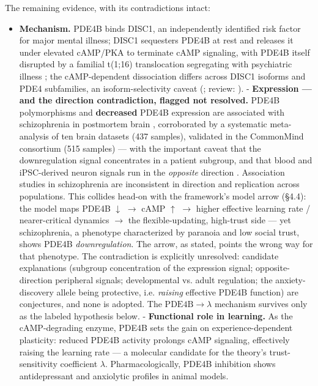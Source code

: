 \documentclass[11pt,twocolumn]{article}
\theoremstyle{plain}
\begin{document}
The remaining evidence, with its contradictions intact:

\begin{itemize}

\item \textbf{Mechanism.} PDE4B binds DISC1, an independently identified risk factor for major mental illness; DISC1 sequesters PDE4B at rest and releases it under elevated cAMP/PKA to terminate cAMP signaling, with PDE4B itself disrupted by a familial t(1;16) translocation segregating with psychiatric illness \citep{millar2005}; the cAMP-dependent dissociation differs across DISC1 isoforms and PDE4 subfamilies, an isoform-selectivity caveat (\citealp{murdoch2007}; review: \citealp{millar2007}).
- \textbf{Expression — and the direction contradiction, flagged not resolved.} PDE4B polymorphisms and \textbf{decreased} PDE4B expression are associated with schizophrenia in postmortem brain \citep{fatemi2008}, corroborated by a systematic meta-analysis of ten brain datasets (437 samples), validated in the CommonMind consortium (515 samples) — with the important caveat that the downregulation signal concentrates in a patient subgroup, and that blood and iPSC-derived neuron signals run in the \textit{opposite} direction \citep{burrack2024}. Association studies in schizophrenia are inconsistent in direction and replication across populations. This collides head-on with the framework's model arrow (\S{}4.4): the model maps PDE4B $\downarrow$ $\to$ cAMP $\uparrow$ $\to$ higher effective learning rate / nearer-critical dynamics $\to$ the flexible-updating, high-trust side — yet schizophrenia, a phenotype characterized by paranoia and low social trust, shows PDE4B \textit{downregulation}. The arrow, as stated, points the wrong way for that phenotype. The contradiction is explicitly unresolved: candidate explanations (subgroup concentration of the expression signal; opposite-direction peripheral signals; developmental vs. adult regulation; the anxiety-discovery allele being protective, i.e. \textit{raising} effective PDE4B function) are conjectures, and none is adopted. The $\mathrm{PDE4B} \to \lambda$ mechanism survives only as the labeled hypothesis below.
- \textbf{Functional role in learning.} As the cAMP-degrading enzyme, PDE4B sets the gain on experience-dependent plasticity: reduced PDE4B activity prolongs cAMP signaling, effectively raising the learning rate — a molecular candidate for the theory's trust-sensitivity coefficient $\lambda$. Pharmacologically, PDE4B inhibition shows antidepressant and anxiolytic profiles in animal models.

\end{itemize}
\end{document}

